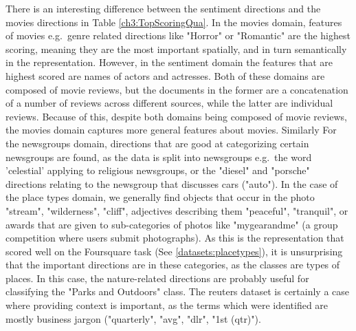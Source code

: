 There is an  interesting difference between the sentiment directions and the movies directions in Table \ref{ch3:TopScoringQua}. In the movies domain, features of movies e.g.\ genre related directions like "Horror" or "Romantic" are the highest scoring, meaning they are the most important spatially, and in turn semantically in the representation. However, in the sentiment domain the features that are highest scored are names of actors and actresses.  Both of these domains are composed of movie reviews, but the documents in the former are a concatenation of a number of reviews across different sources, while the latter are individual reviews. Because of this, despite both domains being composed of movie reviews, the movies domain captures more general features about movies. Similarly For the newsgroups domain, directions  that are good at categorizing certain newsgroups are found, as the data is split into newsgroups e.g.\  the word 'celestial' applying to religious newsgroups, or the "diesel" and "porsche" directions relating to the newsgroup that discusses cars ("auto"). In the case of the place types domain, we generally find objects that occur in the photo "stream", "wilderness", "cliff", adjectives describing them "peaceful", "tranquil", or  awards that are given to sub-categories of photos like "mygearandme" (a group competition where users submit photographs). As this is the representation that scored well on the Foursquare task (See \ref{datasets:placetypes}), it is unsurprising that the important directions are in these categories, as the classes are types of places. In this case, the nature-related directions are probably useful for classifying the "Parks and Outdoors" class. The reuters dataset is certainly a case where providing context is important, as the terms which were identified are  mostly business jargon ("quarterly", "avg", "dlr", "1st (qtr)"). 
